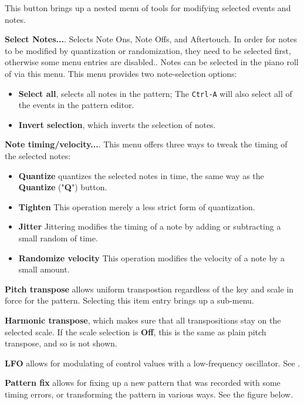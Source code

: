    This button brings up a nested menu of tools for modifying selected
   events and notes.

   \begin{enumber}
      \item \textbf{Select Notes...}.
      Selects Note Ons, Note Offs, and Aftertouch.
      In order for notes to be modified by quantization or randomization,
      they need to be selected first, otherwise some menu entries are
      disabled..
      Notes can be selected in the piano roll of via this menu.
      This menu provides two note-selection options:
         \begin{itemize}
            \item \textbf{Select all}, selects all notes in the pattern;
               The  \texttt{Ctrl-A} will also select
               all of the events in the pattern editor.
            \item \textbf{Invert selection}, which inverts the selection of
               notes.
         \end{itemize}
      \item \textbf{Note timing/velocity...}. This menu
            offers three ways to tweak the timing of the selected notes:
         \begin{itemize}
            \item \textbf{Quantize}
               quantizes the selected notes in time, the same way as the
               \textbf{Quantize} ("\textbf{Q}") button.
            \item \textbf{Tighten}
               This operation merely a less strict form of quantization.
            \item \textbf{Jitter}
               Jittering modifies the timing of a note by adding or subtracting
               a small random of time.
            \item \textbf{Randomize velocity}
               This operation modifies the velocity of a note by a small
               amount.
         \end{itemize}
      \item \textbf{Pitch transpose} allows uniform transpostion
         regardless of the key and scale in force for the pattern.
         Selecting this item entry brings up a sub-menu.
      \item \textbf{Harmonic transpose}, which makes sure
         that all transpositions stay on the selected scale.
         If the scale selection is \textbf{Off}, this is the same as plain pitch
         transpose, and so is not shown.
      \item \textbf{LFO} allows for modulating of control values with a
         low-frequency oscillator.
         See .
      \item \textbf{Pattern fix} allows for fixing up a new pattern
         that was recorded with some timing errors, or transforming the
         pattern in various ways.
         See the figure below.
   \end{enumber}

